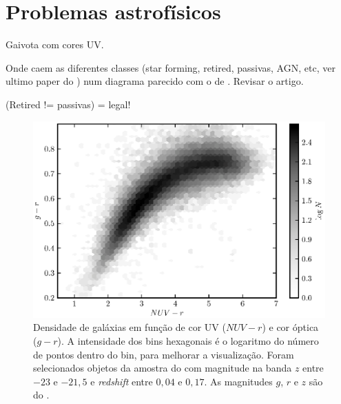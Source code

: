 



\chapter{Problemas astrofísicos}
\label{sec:Problemas}

Gaivota com cores UV.

Onde caem as diferentes classes (star forming, retired, passivas, AGN, etc, ver
ultimo paper do \citet{CidFernandes2011}) num diagrama parecido com o de
\citet{Chilingarian2011}. Revisar o artigo. 

(Retired != passivas) = legal!

\begin{figure}
	\includegraphics{figuras/uvcolor-color-density.eps}
	\caption[Densidade de galáxias no diagrama cor--cor UV.]
	{Densidade de galáxias em função de cor UV ($NUV-r$) e cor óptica ($g-r$). A
	intensidade dos bins hexagonais é o logaritmo do número de pontos dentro do
	bin, para melhorar a visualização. Foram selecionados objetos da amostra do
	\starlight com magnitude na banda $z$ entre $-23$ e $-21,5$ e {\em redshift}
	entre $0,04$ e $0,17$. As magnitudes $g$, $r$ e $z$ são do \SDSS.}
	\label{fig:DensityColor}
\end{figure}

